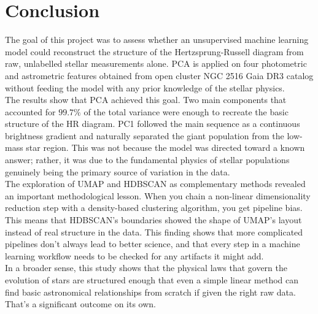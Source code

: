 \documentclass[12pt]{article}
\begin{document}
\section{Conclusion}
The goal of this project was to assess whether an unsupervised machine learning model could reconstruct the structure of the Hertzsprung-Russell diagram from raw, unlabelled stellar measurements alone. PCA is applied on four photometric and astrometric features obtained from open cluster NGC 2516 Gaia DR3 catalog without feeding the model with any prior knowledge of the stellar physics.\\
\newline
The results show that PCA achieved this goal. Two main components that accounted for $99.7\%$ of the total variance were enough to recreate the basic structure of the HR diagram. PC1 followed the main sequence as a continuous brightness gradient and naturally separated the giant population from the low-mass star region. This was not because the model was directed toward a known answer; rather, it was due to the fundamental physics of stellar populations genuinely being the primary source of variation in the data.\\ \newline
The exploration of UMAP and HDBSCAN as complementary methods revealed an important methodological lesson.  When you chain a non-linear dimensionality reduction step with a density-based clustering algorithm, you get pipeline bias. This means that HDBSCAN's boundaries showed the shape of UMAP's layout instead of real structure in the data. This finding shows that more complicated pipelines don't always lead to better science, and that every step in a machine learning workflow needs to be checked for any artifacts it might add.\\
\newline
In a broader sense, this study shows that the physical laws that govern the evolution of stars are structured enough that even a simple linear method can find basic astronomical relationships from scratch if given the right raw data. That's a significant outcome on its own.

\newpage


\end{document}
